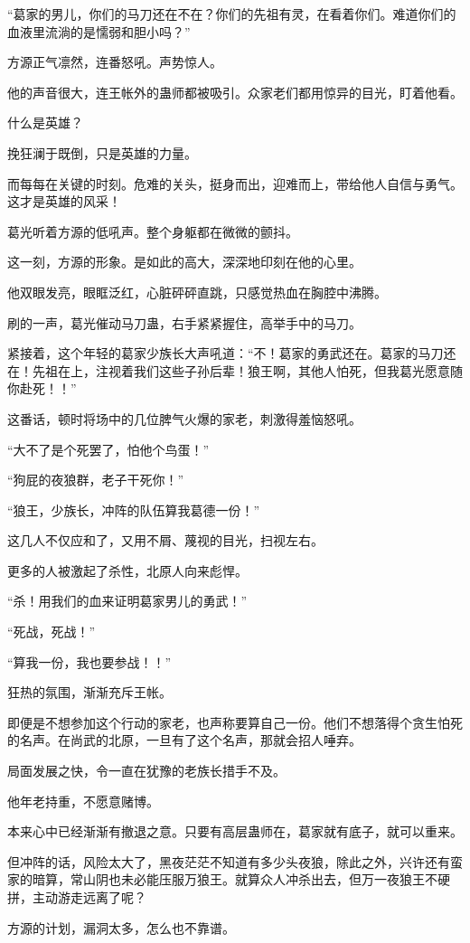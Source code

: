 \begin{this_body}
“葛家的男儿，你们的马刀还在不在？你们的先祖有灵，在看着你们。难道你们的血液里流淌的是懦弱和胆小吗？”

方源正气凛然，连番怒吼。声势惊人。

他的声音很大，连王帐外的蛊师都被吸引。众家老们都用惊异的目光，盯着他看。

什么是英雄？

挽狂澜于既倒，只是英雄的力量。

而每每在关键的时刻。危难的关头，挺身而出，迎难而上，带给他人自信与勇气。这才是英雄的风采！

葛光听着方源的低吼声。整个身躯都在微微的颤抖。

这一刻，方源的形象。是如此的高大，深深地印刻在他的心里。

他双眼发亮，眼眶泛红，心脏砰砰直跳，只感觉热血在胸腔中沸腾。

刷的一声，葛光催动马刀蛊，右手紧紧握住，高举手中的马刀。

紧接着，这个年轻的葛家少族长大声吼道：“不！葛家的勇武还在。葛家的马刀还在！先祖在上，注视着我们这些子孙后辈！狼王啊，其他人怕死，但我葛光愿意随你赴死！！”

这番话，顿时将场中的几位脾气火爆的家老，刺激得羞恼怒吼。

“大不了是个死罢了，怕他个鸟蛋！”

“狗屁的夜狼群，老子干死你！”

“狼王，少族长，冲阵的队伍算我葛德一份！”

这几人不仅应和了，又用不屑、蔑视的目光，扫视左右。

更多的人被激起了杀性，北原人向来彪悍。

“杀！用我们的血来证明葛家男儿的勇武！”

“死战，死战！”

“算我一份，我也要参战！！”

狂热的氛围，渐渐充斥王帐。

即便是不想参加这个行动的家老，也声称要算自己一份。他们不想落得个贪生怕死的名声。在尚武的北原，一旦有了这个名声，那就会招人唾弃。

局面发展之快，令一直在犹豫的老族长措手不及。

他年老持重，不愿意赌博。

本来心中已经渐渐有撤退之意。只要有高层蛊师在，葛家就有底子，就可以重来。

但冲阵的话，风险太大了，黑夜茫茫不知道有多少头夜狼，除此之外，兴许还有蛮家的暗算，常山阴也未必能压服万狼王。就算众人冲杀出去，但万一夜狼王不硬拼，主动游走远离了呢？

方源的计划，漏洞太多，怎么也不靠谱。


\end{this_body}
